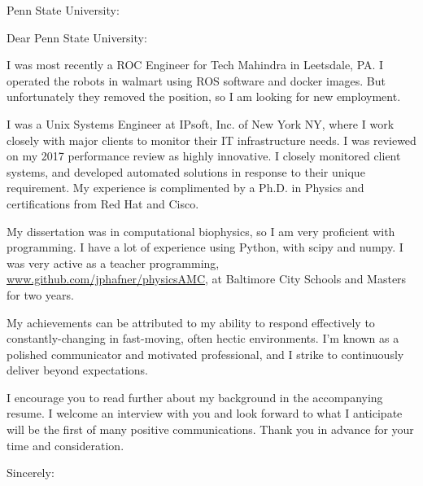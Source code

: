 \documentclass[ jphafner,
    fontsize=11pt,
    foldmarks=false,
    pagenumber=false,
    addrfield=true,
]{scrlttr2}
\date{\today}
\begin{document}
\begin{letter}{Penn State University:}
    \opening{Dear Penn State University:}

    I was most recently a ROC Engineer for Tech Mahindra in Leetsdale, PA.
    I operated the robots in walmart using ROS software and docker images.
    But unfortunately they removed the position, so I am looking for new employment.
    
 I was a Unix Systems Engineer at IPsoft, Inc. of New York NY,
        where I work closely with major clients to monitor their IT infrastructure needs.
    I was reviewed on my 2017 performance review as highly innovative.
    I closely monitored client systems, and developed automated solutions in response to their unique requirement.
    My experience is complimented by a Ph.D. in Physics and certifications from Red Hat and Cisco.

My dissertation was in computational biophysics, so I am very proficient with programming.
    I have a lot of experience using Python, with scipy and numpy.
    I was very active as a teacher programming, \url{www.github.com/jphafner/physicsAMC},
        at Baltimore City Schools and Masters for two years.


My achievements can be attributed to my ability to respond effectively to constantly-changing in fast-moving, often hectic environments. 
    I'm known as a polished communicator and motivated professional, and I strike to continuously deliver beyond expectations.


I encourage you to read further about my background in the accompanying resume. 
    I welcome an interview with you and look forward to what I anticipate will be the first of many positive communications. 
    Thank you in advance for your time and consideration.



\closing{Sincerely:}
\end{letter}
\end{document}
